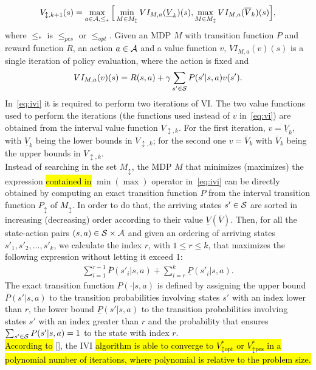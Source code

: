 \begin{align}
V_{\updownarrow, k+1}(s) = \max_{a \in \mathcal{A}, \leq_{*}} \Big[ \min_{M \in M_{\updownarrow}} VI_{M, a}(\underline{V}_{k})(s), \max_{M \in M_{\updownarrow}} VI_{M, a}(\overline{V}_{k})(s) \Big], \label{eq:ivi}
\end{align}
where $\leq_{*}$ is $\leq_{pes}$ or $\leq_{opt}$. Given an \ac{MDP} $M$ with transition function $P$ and reward function $R$, an action $a \in \mathcal{A}$ and a value function $v$, $VI_{M, a}(v)(s)$ is a single iteration of policy evaluation, where the action is fixed and 
\begin{align} 
VI_{M, a}(v)(s) = R(s,a) + \gamma \sum_{s' \in \mathcal{S}} P(s'|s,a)v(s'). \label{eq:vi}
\end{align}
In~\eqref{eq:ivi} it is required to perform two iterations of VI. The two value functions used to perform the iterations (\ie the functions used instead of $v$ in~\eqref{eq:vi}) are obtained from the interval value function $V_{\updownarrow, k}$. For the first iteration, $v = \underline{V}_{k}$, with $\underline{V}_{k}$ being the lower bounds in $V_{\updownarrow, k}$; for the second one $v = \overline{V}_{k}$ with $\overline{V}_{k}$ being the upper bounds in $V_{\updownarrow, k}$.\\
\newline
Instead of searching in the set $M_{\updownarrow}$, the \ac{MDP} $M$ that minimizes (maximizes) the expression \hl{contained in} $\min (\max)$ operator in~\eqref{eq:ivi} can be directly obtained by computing an exact transition function $P$ from the interval transition function $P_{\updownarrow}$ of $M_{\updownarrow}$. In order to do that, the arriving states $s' \in \mathcal{S}$ are sorted in increasing (decreasing) order according to their value $\underline{V}(\overline{V})$. Then, for all the state-action pairs $(s,a) \in \mathcal{S} \times \mathcal{A}$ and given an ordering of arriving states $s'_1, s'_2, ..., s'_k$, we calculate the index $r$, with $1 \leq r \leq k$, that maximizes the following expression without letting it exceed 1:
\begin{align} \sum_{i=1}^{r-1}\overline{P}(s'_i|s,a) + \sum_{i=r}^{k}\underline{P}(s'_i|s,a). \end{align}
The exact transition function $P(\cdot|s,a)$ is defined by assigning the upper bound $\overline{P}(s'|s,a)$ to the transition probabilities involving states $s'$ with an index lower than $r$, the lower bound $\underline{P}(s'|s,a)$ to the transition probabilities involving states $s'$ with an index greater than $r$ and the probability that ensures $\sum_{s' \in \mathcal{S}}P(s'|s,a) = 1$ to the state with index $r$.\\
\newline
\hl{According to} [\cite{givan2000bounded}], the \ac{IVI} \hl{algorithm is able to converge to $V^{*}_{\updownarrow \text{opt}}$ or $V^{*}_{\updownarrow \text{pes}}$ in a polynomial number of iterations, where polynomial is relative to the problem size.}

